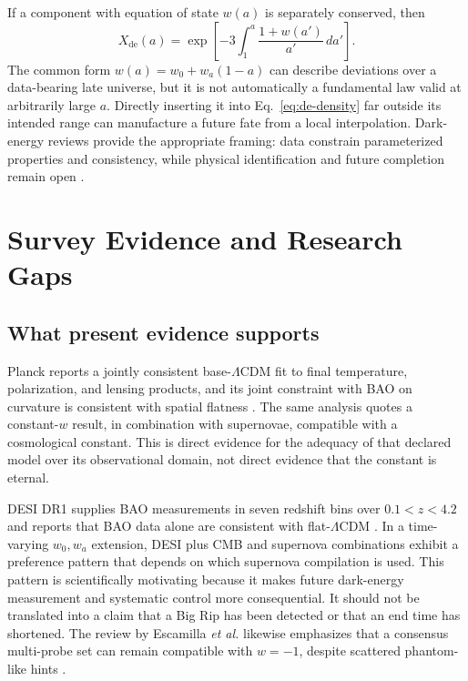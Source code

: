 \documentclass[conference]{IEEEtran}
\newcommand{\lcdm}{\ensuremath{\Lambda\mathrm{CDM}}}
\begin{document}
If a component with equation of state \(w(a)\) is separately conserved, then
\begin{equation}
 X_{\mathrm{de}}(a) =
 \exp\left[-3\int_{1}^{a}\frac{1+w(a')}{a'}\,da'\right].
\label{eq:de-density}
\end{equation}
The common form \(w(a)=w_0+w_a(1-a)\) can describe deviations over a data-bearing late universe, but it is not automatically a fundamental law valid at arbitrarily large \(a\). Directly inserting it into Eq.~\eqref{eq:de-density} far outside its intended range can manufacture a future fate from a local interpolation. Dark-energy reviews provide the appropriate framing: data constrain parameterized properties and consistency, while physical identification and future completion remain open \cite{huterer2018,escamilla2024}.

\section{Survey Evidence and Research Gaps}

\subsection{What present evidence supports}

Planck reports a jointly consistent base-\lcdm{} fit to final temperature, polarization, and lensing products, and its joint constraint with BAO on curvature is consistent with spatial flatness \cite{planck2018}. The same analysis quotes a constant-\(w\) result, in combination with supernovae, compatible with a cosmological constant. This is direct evidence for the adequacy of that declared model over its observational domain, not direct evidence that the constant is eternal.

DESI DR1 supplies BAO measurements in seven redshift bins over \(0.1<z<4.2\) and reports that BAO data alone are consistent with flat-\lcdm{} \cite{desi2025}. In a time-varying \(w_0,w_a\) extension, DESI plus CMB and supernova combinations exhibit a preference pattern that depends on which supernova compilation is used. This pattern is scientifically motivating because it makes future dark-energy measurement and systematic control more consequential. It should not be translated into a claim that a Big Rip has been detected or that an end time has shortened. The review by Escamilla \emph{et al.} likewise emphasizes that a consensus multi-probe set can remain compatible with \(w=-1\), despite scattered phantom-like hints \cite{escamilla2024}.
\end{document}
